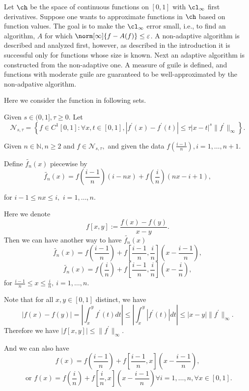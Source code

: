 
Let $\ch$ be the space of continuous functions on $[0,1]$ with $\cl_{\infty}$ first derivatives.  Suppose one wants to approximate functions in $\ch$ based on function values.  The goal is to make the $\cl_{\infty}$ error small, i.e., to find an algorithm, $A$ for which $\norm[\infty]{f - A(f)} \le \varepsilon$.  A non-adaptive algorithm is described and analyzed first, however, as described in the introduction it is successful only for functions whose size is known.  Next an adaptive algorithm is constructed from the non-adaptive one.  A measure of guile is defined, and functions with moderate guile are guaranteed to be well-approximated by the non-adpative algorithm.


Here we consider the function in following sets.

Given $s\in (0,1], \tau \ge 0.$ Let
$$\mathcal{N}_{s, \tau}=\left\{f \in C^{1}[0,1]: \forall x,t \in [0,1], |f^{'}(x)-f^{'}(t)|\leq \tau|x-t|^{s} \|f^{'}\|_{\infty} \right\}.$$

Given $n \in \mathbb{N}, n \ge 2$ and $f \in \mathcal{N}_{s,\tau},$ and given the data
$f\left(\frac{i-1}{n}\right), i=1, \ldots,n+1.$

Define $\tilde{f_{n}}(x)$ piecewise by
$$\tilde{f_{n}}(x)=f\left(\frac{i-1}{n}\right)(i-nx)+f\left(\frac{i}{n}\right)(nx-i+1),$$

for $i-1 \leq nx \leq i,$ $ i=1,\ldots,n.$

Here we denote
$$f[x,y]:=\frac{f(x)-f(y)}{x-y}.$$
Then we can have another way to have $\tilde{f_{n}}(x)$
$$\tilde{f_{n}}(x)=f\left(\frac{i-1}{n}\right)+f\left[\frac{i-1}{n},\frac{i}{n}\right]\left(x-\frac{i-1}{n}\right),$$
 $$\tilde{f_{n}}(x)=f\left(\frac{i}{n}\right)+f\left[\frac{i-1}{n},\frac{i}{n}\right]\left(x-\frac{i}{n}\right),$$
 for $\frac{i-1}{n} \leq x \leq \frac{i}{n}, \ i=1, \ldots, n.$

 Note that for all $x,y \in [0,1]$ distinct, we have
 $$|f(x)-f(y)|=\left|\int_{x}^{y}f^{'}(t)dt\right|\leq \left|\int_{x}^{y}\left|f^{'}(t)\right|dt\right|
 \leq |x-y|\|f^{'}\|_{\infty}.$$
 Therefore we have $|f[x,y]|\leq \|f^{'}\|_{\infty}.$

 And we can also have
 $$f(x)=f\left(\frac{i-1}{n}\right)+f\left[\frac{i-1}{n},x\right]\left(x-\frac{i-1}{n}\right),$$
  $$\text{ or } f(x)=f\left(\frac{i}{n}\right)+f\left[\frac{i}{n},x\right]\left(x-\frac{i-1}{n}\right)  \forall i=1,\ldots,n, \forall x \in [0,1].$$

